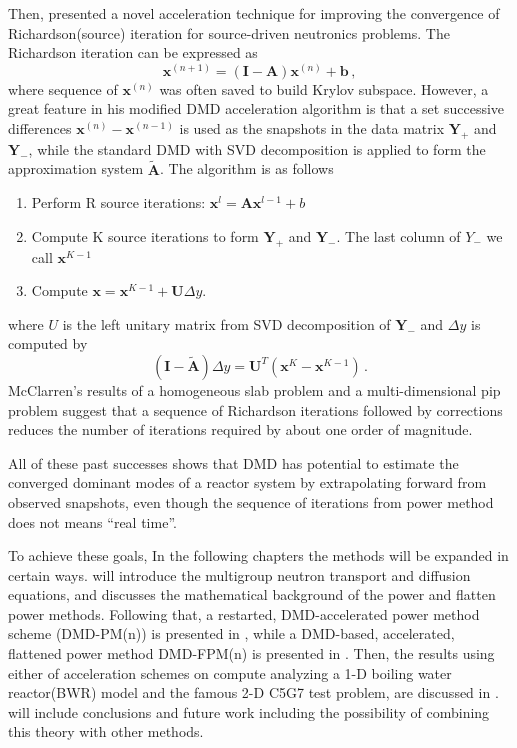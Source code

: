 Then, \citet{mcclarren_acceleration_2018} presented a novel acceleration technique for improving the convergence of Richardson(source) iteration for source-driven neutronics problems.
The Richardson iteration can be expressed as 
\begin{equation}
 \mathbf{x}^{(n+1)} = (\mathbf{I}-\mathbf{A})\mathbf{x}^{(n)} + \mathbf{b} \, ,
 \label{eq:richardson}
\end{equation}
where sequence of $\mathbf{x}^{(n)}$ was often saved to build Krylov subspace. 
However, a great feature in his modified DMD acceleration algorithm is that a set successive differences $\mathbf{x}^{(n)}-\mathbf{x}^{(n-1)}$ is used as the snapshots in the data matrix $\mathbf{Y}_+$ and $\mathbf{Y}_-$, while the standard DMD with SVD decomposition is applied to form the approximation system $\mathbf{\tilde{A}}$.
The algorithm is as follows
\begin{enumerate}
 \item Perform R source iterations: $\mathbf{x}^{l} = \mathbf{A} \mathbf{x}^{l-1} +b$
 \item Compute K source iterations to form $\mathbf{Y}_+$ and $\mathbf{Y}_-$. The last column of $Y_-$ we call $\mathbf{x}^{K-1}$ 
 \item Compute $\mathbf{x} = \mathbf{x}^{K-1} + \mathbf{U} \Delta y$.
\end{enumerate} 
where $U$ is the left unitary matrix from SVD decomposition of $\mathbf{Y}_-$ and $\Delta y$ is computed by 
\begin{equation}
 (\mathbf{I} - \mathbf{\tilde{A}}) \Delta y = \mathbf{U}^T(\mathbf{x}^{K} - \mathbf{x}^{K-1})\, .
 \label{eq:McClarren}
\end{equation}
McClarren's results of a homogeneous slab problem and a multi-dimensional pip problem suggest that a sequence of Richardson iterations followed by corrections reduces the number of iterations required by about one order of magnitude.

All of these past successes shows that DMD has potential to estimate the converged dominant modes of a reactor system by extrapolating forward from observed snapshots, even though the sequence of iterations from power method does not means ``real time''.

To achieve these goals, In the following chapters the methods will be expanded in certain ways.
 will introduce the multigroup neutron transport and diffusion equations, and  discusses the mathematical background of the power and flatten power methods.
Following that, a restarted, DMD-accelerated power method scheme (DMD-PM(n)) is presented in , while a DMD-based, accelerated, flattened power
method DMD-FPM(n) is presented in .
Then, the results using either of acceleration schemes on compute analyzing a 1-D boiling water reactor(BWR) model and the famous 2-D C5G7 test problem, are discussed in .
 will include conclusions and future work including the possibility of combining this theory with other methods. 